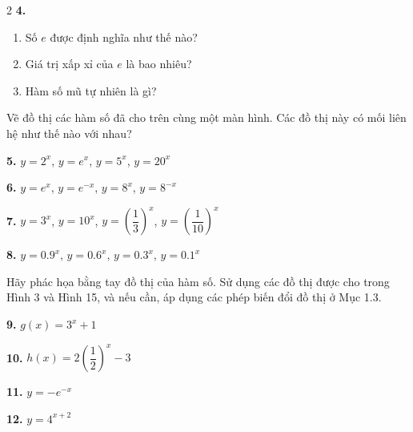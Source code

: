 \begin{multicols}{2}
\vspace{0.4em}
\noindent\textbf{4.}
\begin{enumerate}[label=(\alph*),leftmargin=*,itemsep=2pt,topsep=1pt]
\item Số $e$ được định nghĩa như thế nào?
\item Giá trị xấp xỉ của $e$ là bao nhiêu?
\item Hàm số mũ tự nhiên là gì?
\end{enumerate}

\vspace{0.6em}
\noindent{}\quad Vẽ đồ thị các hàm số đã cho trên cùng một màn hình. Các đồ thị này có mối liên hệ như thế nào với nhau?

\vspace{0.3em}
\noindent\textbf{5.} $y = 2^x$, \quad $y = e^x$, \quad $y = 5^x$, \quad $y = 20^x$

\vspace{0.2em}
\noindent\textbf{6.} $y = e^x$, \quad $y = e^{-x}$, \quad $y = 8^x$, \quad $y = 8^{-x}$

\vspace{0.2em}
\noindent\textbf{7.} $y = 3^x$, \quad $y = 10^x$, \quad $y = \left(\dfrac{1}{3}\right)^x$, \quad $y = \left(\dfrac{1}{10}\right)^x$

\vspace{0.2em}
\noindent\textbf{8.} $y = 0.9^x$, \quad $y = 0.6^x$, \quad $y = 0.3^x$, \quad $y = 0.1^x$

\vspace{0.6em}
\quad Hãy phác họa bằng tay đồ thị của hàm số. Sử dụng các đồ thị được cho trong Hình 3 và Hình 15, và nếu cần, áp dụng các phép biến đổi đồ thị ở Mục 1.3.

\vspace{0.3em}
\noindent\parbox[t]{0.48\linewidth}{\textbf{9.} $g(x) = 3^x + 1$}
\hfill
\parbox[t]{0.48\linewidth}{\textbf{10.} $h(x) = 2\left(\dfrac{1}{2}\right)^x - 3$}

\vspace{0.3em}
\noindent\parbox[t]{0.48\linewidth}{\textbf{11.} $y = -e^{-x}$}
\hfill
\parbox[t]{0.48\linewidth}{\textbf{12.} $y = 4^{x+2}$}


\end{multicols}
